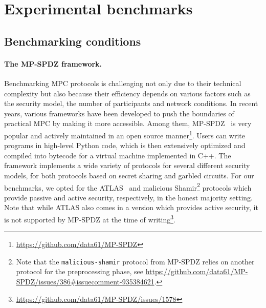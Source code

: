 \section{Experimental benchmarks}

\subsection{Benchmarking conditions}
\paragraph{The MP-SPDZ framework.}
Benchmarking MPC protocols is challenging not only due to their technical complexity but also because their efficiency depends on various factors such as the security model, the number of participants and network conditions.
In recent years, various frameworks have been developed to push the boundaries of practical MPC by making it more accessible.
Among them, MP-SPDZ~\cite{mp-spdz} is very popular and actively maintained in an open source manner\footnote{\url{https://github.com/data61/MP-SPDZ}}.
Users can write programs in high-level Python code, which is then extensively optimized and compiled into bytecode for a virtual machine implemented in C++.
The framework implements a wide variety of protocols for several different security models, for both protocols based on secret sharing and garbled circuits.
For our benchmarks, we opted for the ATLAS~\cite{atlas2021} and malicious Shamir\footnote{Note that the \texttt{malicious-shamir} protocol from MP-SPDZ relies on another protocol for the preprocessing phase, see \url{https://github.com/data61/MP-SPDZ/issues/386\#issuecomment-935384621}.}\cite{malshamir2017} protocols which provide passive and active security, respectively, in the honest majority setting.
Note that while ATLAS also comes in a version which provides active security, it is not supported by MP-SPDZ at the time of writing\footnote{\url{https://github.com/data61/MP-SPDZ/issues/1578}}.


